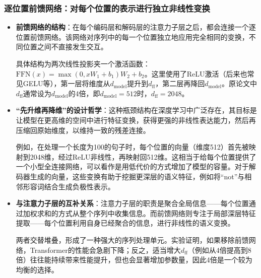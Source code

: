 \documentclass[11pt]{beamer}
\begin{document}
\begin{frame}
\frametitle{逐位置前馈网络：对每个位置的表示进行独立非线性变换}
\begin{itemize}
    \item \textbf{前馈网络的结构}：在每个编码层和解码层的注意力子层之后，都会连接一个\alert{逐位置前馈网络}。该网络对序列中的每一个位置独立地应用完全相同的变换，不同位置之间不直接发生交互。
    
    具体结构为两次线性投影夹一个激活函数：\(\text{FFN}(x) = \max(0, xW_1 + b_1)W_2 + b_2\)。这里使用了\alert{ReLU}激活（后来也常见GELU等），第一层将维度从\(d_{\text{model}}\)提升到\(d_{\text{ff}}\)，第二层再降回\(d_{\text{model}}\)。原论文中\(d_{\text{ff}}\)通常设为\(d_{\text{model}}\)的\alert{4倍}，即\(d_{\text{model}}=512\)时，\(d_{\text{ff}}=2048\)。

    \item \textbf{“先升维再降维”的设计哲学}：这种瓶颈结构在深度学习中广泛存在，其目标是让模型在更高维的空间中进行特征变换，获得更强的非线性表达能力，然后再压缩回原始维度，以维持一致的残差连接。
    
    例如，在处理一个长度为100的句子时，每个位置的向量（维度512）首先被映射到2048维，经过ReLU非线性，再映射回512维。这相当于给每个位置提供了一个\alert{小型全连接网络}，可以看作是用低代价的方式增加了模型的容量。对于解码器生成的向量，这些变换有助于挖掘更深层的语义特征，例如将“not”与相邻形容词结合生成负极性表示。

    \item \textbf{与注意力子层的互补关系}：注意力子层的职责是\alert{聚合全局信息}——每个位置通过加权求和的方式从整个序列中收集信息。而前馈网络则专注于\alert{局部深层特征提取}——每个位置利用自身已经聚合的信息，进行非线性的语义变换。
    
    两者交替堆叠，形成了一种强大的序列处理单元。实验证明，如果移除前馈网络，Transformer的性能会急剧下降；反之，适当增大\(d_{\text{ff}}\)（例如从4倍提高到8倍）往往能持续带来性能提升，但也会显著增加参数量，因此4倍是一个较为均衡的选择。
\end{itemize}
\end{frame}
\end{document}
